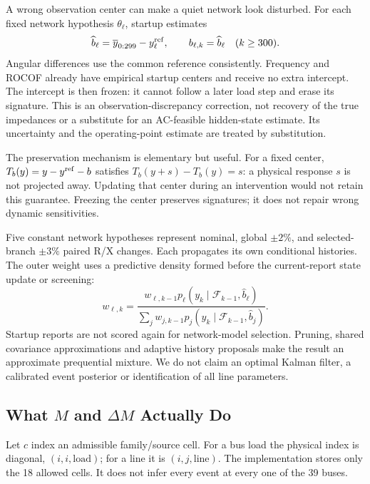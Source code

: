 A wrong observation center can make a quiet network look disturbed. For each fixed network hypothesis $\theta_\ell$, startup estimates
\begin{equation}
 \widehat b_\ell=\overline y_{0:299}-y^{\rm ref}_\ell,
 \qquad b_{\ell,k}=\widehat b_\ell\quad(k\geq300).
 \label{eq:continuous-intercept}
\end{equation}
Angular differences use the common reference consistently. Frequency and ROCOF already have empirical startup centers and receive no extra intercept. The intercept is then frozen: it cannot follow a later load step and erase its signature. This is an observation-discrepancy correction, not recovery of the true impedances or a substitute for an AC-feasible hidden-state estimate. Its uncertainty and the operating-point estimate are treated by substitution.

The preservation mechanism is elementary but useful. For a fixed center, $T_b(y)=y-y^{\rm ref}-b$ satisfies $T_b(y+s)-T_b(y)=s$: a physical response $s$ is not projected away. Updating that center during an intervention would not retain this guarantee. Freezing the center preserves signatures; it does not repair wrong dynamic sensitivities.

Five constant network hypotheses represent nominal, global $\pm2\%$, and selected-branch $\pm3\%$ paired R/X changes. Each propagates its own conditional histories. The outer weight uses a predictive density formed before the current-report state update or screening:
\begin{equation}
 w_{\ell,k}=\frac{w_{\ell,k-1}p_\ell(y_k\mid\mathcal F_{k-1},\widehat b_\ell)}
 {\sum_jw_{j,k-1}p_j(y_k\mid\mathcal F_{k-1},\widehat b_j)}.
 \label{eq:continuous-weights}
\end{equation}
Startup reports are not scored again for network-model selection. Pruning, shared covariance approximations and adaptive history proposals make the result an approximate prequential mixture. We do not claim an optimal Kalman filter, a calibrated event posterior or identification of all line parameters.

\subsection{What $M$ and $\Delta M$ Actually Do}

Let $c$ index an admissible family/source cell. For a bus load the physical index is diagonal, $(i,i,\mathrm{load})$; for a line it is $(i,j,\mathrm{line})$. The implementation stores only the 18 allowed cells. It does not infer every event at every one of the 39 buses.

